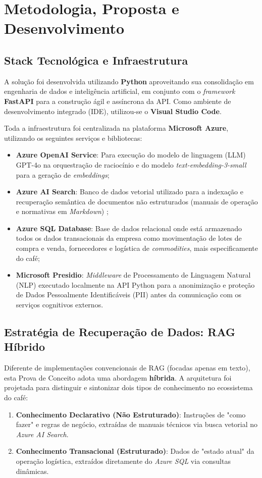 \chapter{Metodologia, Proposta e Desenvolvimento} \label{Cap:Metodologia}

\section{Stack Tecnológica e Infraestrutura}

A solução foi desenvolvida utilizando \textbf{Python} aproveitando sua consolidação em engenharia de dados e inteligência artificial, em conjunto com o \textit{framework} \textbf{FastAPI} para a construção ágil e assíncrona da API. Como ambiente de desenvolvimento integrado (IDE), utilizou-se o \textbf{Visual Studio Code}.

Toda a infraestrutura foi centralizada na plataforma \textbf{Microsoft Azure}, utilizando os seguintes serviços e bibliotecas:
\begin{itemize}
    \item \textbf{Azure OpenAI Service}: Para execução do modelo de linguagem (LLM) GPT-4o na orquestração de raciocínio e do modelo \textit{text-embedding-3-small} para a geração de \textit{embeddings};
    \item \textbf{Azure AI Search}: Banco de dados vetorial utilizado para a indexação e recuperação semântica de documentos não estruturados (manuais de operação e normativas em \textit{Markdown}) \cite{baeza2011modern};
    \item \textbf{Azure SQL Database}: Base de dados relacional onde está armazenado todos os dados transacionais da empresa como movimentação de lotes de compra e venda, fornecedores e logística de \textit{commodities}, mais especificamente do café;
    \item \textbf{Microsoft Presidio}: \textit{Middleware} de Processamento de Linguagem Natural (NLP) executado localmente na API Python para a anonimização e proteção de Dados Pessoalmente Identificáveis (PII) antes da comunicação com os serviços cognitivos externos.
\end{itemize}

\section{Estratégia de Recuperação de Dados: RAG Híbrido}

Diferente de implementações convencionais de RAG (focadas apenas em texto), esta Prova de Conceito adota uma abordagem \textbf{híbrida}. A arquitetura foi projetada para distinguir e sintonizar dois tipos de conhecimento no ecossistema do café:
\begin{enumerate}
    \item \textbf{Conhecimento Declarativo (Não Estruturado)}: Instruções de "como fazer" e regras de negócio, extraídas de manuais técnicos via busca vetorial no \textit{Azure AI Search}.
    \item \textbf{Conhecimento Transacional (Estruturado)}: Dados de "estado atual" da operação logística, extraídos diretamente do \textit{Azure SQL} via consultas dinâmicas.
\end{enumerate}

